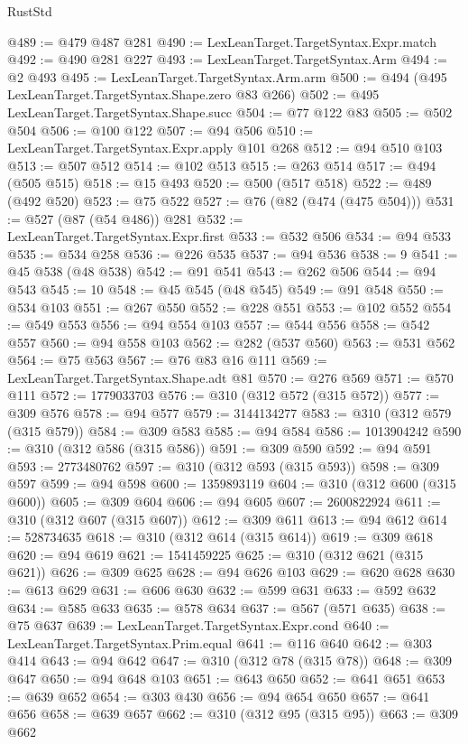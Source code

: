 \begin{lexlean}{RustStd}
\begin{coremodule}
@489 := @479 @487 @281
@490 := LexLeanTarget.TargetSyntax.Expr.match
@492 := @490 @281 @227
@493 := LexLeanTarget.TargetSyntax.Arm
@494 := @2 @493
@495 := LexLeanTarget.TargetSyntax.Arm.arm
@500 := @494 (@495 LexLeanTarget.TargetSyntax.Shape.zero @83 @266)
@502 := @495 LexLeanTarget.TargetSyntax.Shape.succ
@504 := @77 @122 @83
@505 := @502 @504
@506 := @100 @122
@507 := @94 @506
@510 := LexLeanTarget.TargetSyntax.Expr.apply @101 @268
@512 := @94 @510 @103
@513 := @507 @512
@514 := @102 @513
@515 := @263 @514
@517 := @494 (@505 @515)
@518 := @15 @493
@520 := @500 (@517 @518)
@522 := @489 (@492 @520)
@523 := @75 @522
@527 := @76 (@82 (@474 (@475 @504)))
@531 := @527 (@87 (@54 @486)) @281
@532 := LexLeanTarget.TargetSyntax.Expr.first
@533 := @532 @506
@534 := @94 @533
@535 := @534 @258
@536 := @226 @535
@537 := @94 @536
@538 := 9
@541 := @45 @538 (@48 @538)
@542 := @91 @541
@543 := @262 @506
@544 := @94 @543
@545 := 10
@548 := @45 @545 (@48 @545)
@549 := @91 @548
@550 := @534 @103
@551 := @267 @550
@552 := @228 @551
@553 := @102 @552
@554 := @549 @553
@556 := @94 @554 @103
@557 := @544 @556
@558 := @542 @557
@560 := @94 @558 @103
@562 := @282 (@537 @560)
@563 := @531 @562
@564 := @75 @563
@567 := @76 @83 @16 @111
@569 := LexLeanTarget.TargetSyntax.Shape.adt @81
@570 := @276 @569
@571 := @570 @111
@572 := 1779033703
@576 := @310 (@312 @572 (@315 @572))
@577 := @309 @576
@578 := @94 @577
@579 := 3144134277
@583 := @310 (@312 @579 (@315 @579))
@584 := @309 @583
@585 := @94 @584
@586 := 1013904242
@590 := @310 (@312 @586 (@315 @586))
@591 := @309 @590
@592 := @94 @591
@593 := 2773480762
@597 := @310 (@312 @593 (@315 @593))
@598 := @309 @597
@599 := @94 @598
@600 := 1359893119
@604 := @310 (@312 @600 (@315 @600))
@605 := @309 @604
@606 := @94 @605
@607 := 2600822924
@611 := @310 (@312 @607 (@315 @607))
@612 := @309 @611
@613 := @94 @612
@614 := 528734635
@618 := @310 (@312 @614 (@315 @614))
@619 := @309 @618
@620 := @94 @619
@621 := 1541459225
@625 := @310 (@312 @621 (@315 @621))
@626 := @309 @625
@628 := @94 @626 @103
@629 := @620 @628
@630 := @613 @629
@631 := @606 @630
@632 := @599 @631
@633 := @592 @632
@634 := @585 @633
@635 := @578 @634
@637 := @567 (@571 @635)
@638 := @75 @637
@639 := LexLeanTarget.TargetSyntax.Expr.cond
@640 := LexLeanTarget.TargetSyntax.Prim.equal
@641 := @116 @640
@642 := @303 @414
@643 := @94 @642
@647 := @310 (@312 @78 (@315 @78))
@648 := @309 @647
@650 := @94 @648 @103
@651 := @643 @650
@652 := @641 @651
@653 := @639 @652
@654 := @303 @430
@656 := @94 @654 @650
@657 := @641 @656
@658 := @639 @657
@662 := @310 (@312 @95 (@315 @95))
@663 := @309 @662

\end{coremodule}
\end{lexlean}
